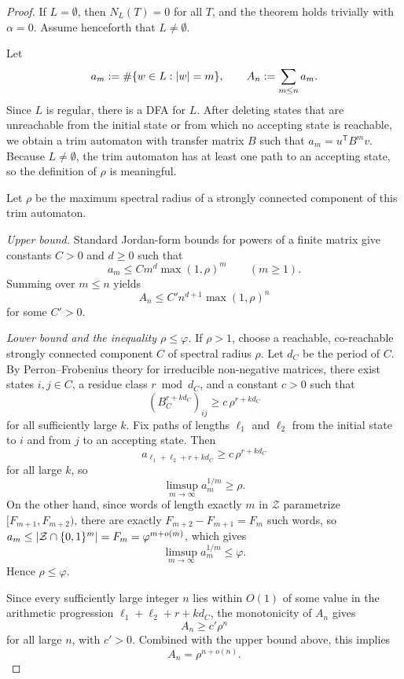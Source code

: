 \begin{proof}
  If \(L=\emptyset\), then \(N_L(T)=0\) for all \(T\), and the theorem
  holds trivially with \(\alpha=0\). Assume henceforth that
  \(L\neq\emptyset\).

  Let
  \[
    a_m:=\#\{w\in L:\lvert w \rvert=m\},
    \qquad
    A_n:=\sum_{m\le n}a_m.
  \]
  Since \(L\) is regular, there is a DFA for \(L\). After deleting
  states that are unreachable from the initial state or from which no
  accepting state is reachable, we obtain a trim automaton with
  transfer matrix \(B\) such that \(a_m=u^{\mathsf T}B^m v\). Because
  \(L\neq\emptyset\), the trim automaton has at least one path to an
  accepting state, so the definition of \(\rho\) is meaningful.

  Let \(\rho\) be the maximum spectral radius of a strongly connected
  component of this trim automaton.

  \textit{Upper bound.} Standard Jordan-form bounds for
  powers of a finite matrix give constants \(C>0\) and \(d\ge 0\) such
  that
  \[
    a_m\le C m^d\max(1,\rho)^m
    \qquad (m\ge 1).
  \]
  Summing over \(m\le n\) yields
  \[
    A_n\le C' n^{d+1}\max(1,\rho)^n
  \]
  for some \(C'>0\).

  \textit{Lower bound and the inequality \(\rho\le\varphi\).}
  If \(\rho>1\), choose a reachable, co-reachable strongly connected
  component \(C\) of spectral radius \(\rho\). Let \(d_C\) be the
  period of \(C\). By Perron--Frobenius theory for irreducible
  non-negative matrices, there exist states \(i,j\in C\), a residue
  class \(r\bmod d_C\), and a constant \(c>0\) such that
  \[
    (B_C^{r+k d_C})_{ij}\ge c\,\rho^{r+k d_C}
  \]
  for all sufficiently large \(k\). Fix paths of lengths \(\ell_1\) and
  \(\ell_2\) from the initial state to \(i\) and from \(j\) to an
  accepting state. Then
  \[
    a_{\ell_1+\ell_2+r+k d_C}\ge c\,\rho^{r+k d_C}
  \]
  for all large \(k\), so
  \[
    \limsup_{m\to\infty}a_m^{1/m}\ge\rho.
  \]
  On the other hand, since words of length exactly \(m\) in
  \(\mathcal Z\) parametrize \([F_{m+1},F_{m+2})\), there are
  exactly \(F_{m+2}-F_{m+1}=F_m\) such words, so
  \(a_m\le\lvert \mathcal Z\cap\{0,1\}^m \rvert=F_m=\varphi^{m+o(m)}\), which gives
  \[
    \limsup_{m\to\infty}a_m^{1/m}\le\varphi.
  \]
  Hence \(\rho\le\varphi\).

  Since every sufficiently large integer \(n\) lies
  within \(O(1)\) of some value in the arithmetic progression
  \(\ell_1+\ell_2+r+kd_C\), the monotonicity of \(A_n\) gives
  \[
    A_n\ge c'\rho^n
  \]
  for all large \(n\), with \(c'>0\). Combined with the upper bound
  above, this implies
  \[
    A_n=\rho^{n+o(n)}.
  \]


\end{proof}

